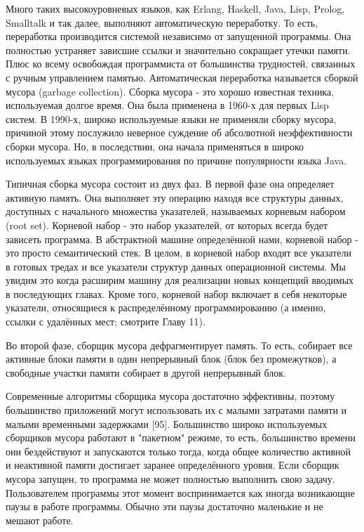 Много таких высокоуровневых языков, как Erlang, Haskell, Java, Lisp, Prolog, Smalltalk и так далее, выполняют автоматическую переработку. То есть, переработка производится системой независимо от запущенной программы. Она полностью устраняет зависшие ссылки и значительно сокращает утечки памяти. Плюс ко всему освобождая программиста от большинства трудностей, связанных с ручным управлением памятью. Автоматическая переработка называется сборкой мусора (garbage collection). Сборка мусора - это хорошо известная техника, используемая долгое время. Она была применена в 1960-х для первых Lisp систем. В 1990-х, широко используемые языки не применяли сборку мусора, причиной этому послужило неверное суждение об абсолютной неэффективности сборки мусора. Но, в последствии, она начала применяться в широко используемых языках программирования по причине популярности языка Java.

Типичная сборка мусора состоит из двух фаз. В первой фазе она определяет активную память. Она выполняет эту операцию находя все структуры данных, доступных с начального множества указателей, называемых корневым набором (root set). Корневой набор - это набор указателей, от которых всегда будет зависеть программа. В абстрактной машине определённой нами, корневой набор - это просто семантический стек. В целом, в корневой набор входят все указатели в готовых тредах и все указатели структур данных операционной системы. Мы увидим это когда расширим машину для реализации новых концепций вводимых в последующих главах. Кроме того, корневой набор включает в себя некоторые указатели, относящиеся к распределённому программированию (а именно, ссылки с удалённых мест; смотрите Главу 11).

Во второй фазе, сборщик мусора дефрагментирует память. То есть, собирает все активные блоки памяти в один непрерывный блок (блок без промежутков), а свободные участки памяти собирает в другой непрерывный блок.

Современные алгоритмы сборщика мусора достаточно эффективны, поэтому большинство приложений могут использовать их с малыми затратами памяти и малыми временными задержками [95]. Большинство широко используемых сборщиков мусора работают в "пакетном" режиме, то есть, большинство времени они бездействуют и запускаются только тогда, когда общее количество активной и неактивной памяти достигает заранее определённого уровня. Если сборщик мусора запущен, то программа не может полностью выполнить свою задачу. Пользователем программы этот момент воспринимается как иногда возникающие паузы в работе программы. Обычно эти паузы достаточно маленькие и не мешают работе.

